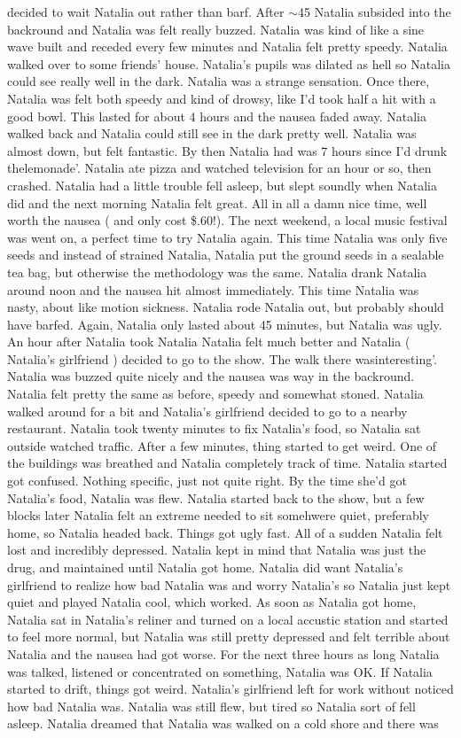 \documentclass[12pt]{book}
\begin{document}
decided to wait Natalia out rather than barf. After $\sim$45 Natalia subsided into the backround and Natalia was felt really buzzed. Natalia was kind of like a sine wave built and receded every few minutes and Natalia felt pretty speedy. Natalia walked over to some friends' house. Natalia's pupils was dilated as hell so Natalia could see really well in the dark. Natalia was a strange sensation. Once there, Natalia was felt both speedy and kind of drowsy, like I'd took half a hit with a good bowl. This lasted for about 4 hours and the nausea faded away. Natalia walked back and Natalia could still see in the dark pretty well. Natalia was almost down, but felt fantastic. By then Natalia had was 7 hours since I'd drunk thelemonade'. Natalia ate pizza and watched television for an hour or so, then crashed. Natalia had a little trouble fell asleep, but slept soundly when Natalia did and the next morning Natalia felt great. All in all a damn nice time, well worth the nausea ( and only cost \$.60!). The next weekend, a local music festival was went on, a perfect time to try Natalia again. This time Natalia was only five seeds and instead of strained Natalia, Natalia put the ground seeds in a sealable tea bag, but otherwise the methodology was the same. Natalia drank Natalia around noon and the nausea hit almost immediately. This time Natalia was nasty, about like motion sickness. Natalia rode Natalia out, but probably should have barfed. Again, Natalia only lasted about 45 minutes, but Natalia was ugly. An hour after Natalia took Natalia Natalia felt much better and Natalia ( Natalia's girlfriend ) decided to go to the show. The walk there wasinteresting'. Natalia was buzzed quite nicely and the nausea was way in the backround. Natalia felt pretty the same as before, speedy and somewhat stoned. Natalia walked around for a bit and Natalia's girlfriend decided to go to a nearby restaurant. Natalia took twenty minutes to fix Natalia's food, so Natalia sat outside watched traffic. After a few minutes, thing started to get weird. One of the buildings was breathed and Natalia completely track of time. Natalia started got confused. Nothing specific, just not quite right. By the time she'd got Natalia's food, Natalia was flew. Natalia started back to the show, but a few blocks later Natalia felt an extreme needed to sit somehwere quiet, preferably home, so Natalia headed back. Things got ugly fast. All of a sudden Natalia felt lost and incredibly depressed. Natalia kept in mind that Natalia was just the drug, and maintained until Natalia got home. Natalia did want Natalia's girlfriend to realize how bad Natalia was and worry Natalia's so Natalia just kept quiet and played Natalia cool, which worked. As soon as Natalia got home, Natalia sat in Natalia's reliner and turned on a local accustic station and started to feel more normal, but Natalia was still pretty depressed and felt terrible about Natalia and the nausea had got worse. For the next three hours as long Natalia was talked, listened or concentrated on something, Natalia was OK. If Natalia started to drift, things got weird. Natalia's girlfriend left for work without noticed how bad Natalia was. Natalia was still flew, but tired so Natalia sort of fell asleep. Natalia dreamed that Natalia was walked on a cold shore and there was 
\end{document}

